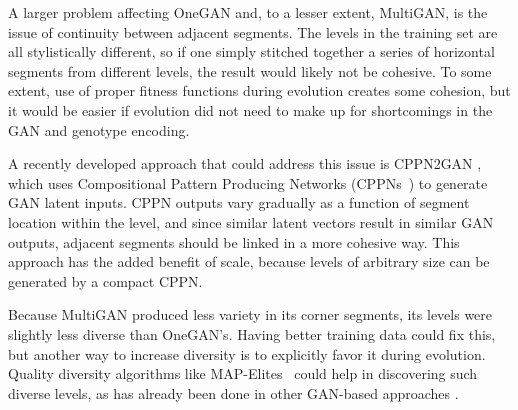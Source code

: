 

A larger problem affecting OneGAN and, to a lesser extent, MultiGAN, is the issue of continuity between adjacent segments. The levels in the training set are all stylistically different,
so if one simply stitched together a series of horizontal segments from different levels, the result would likely not be cohesive. 
To some extent, use of proper fitness functions during evolution creates some cohesion, but it would be easier if evolution did not need to make up for shortcomings in the GAN and genotype encoding.

A recently developed approach that could address this issue is CPPN2GAN \cite{schrum:gecco2020cppn2gan}, which uses Compositional Pattern Producing Networks (CPPNs~\cite{stanley:gpem2007}) to generate GAN latent inputs. CPPN outputs vary gradually as a function of segment location within the level, and since similar latent vectors result in similar GAN outputs, adjacent segments should be linked in a more cohesive way. This approach has the added benefit of scale, because levels of arbitrary size can be generated by a compact CPPN.


Because MultiGAN produced less variety in its corner segments, its levels were slightly less diverse than OneGAN's. Having better training data could fix this, but another way to increase diversity is to explicitly favor it during evolution. Quality diversity algorithms like MAP-Elites~\cite{mouret:arxiv15} could help in discovering such diverse levels, as has already been done in other GAN-based approaches \cite{schrum:gecco2020cppn2gan,fontaine2020illuminating,steckel2021illuminating}.

